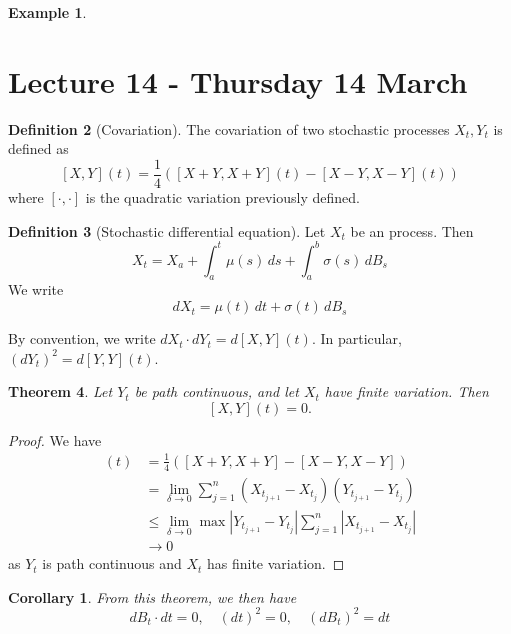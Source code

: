 \documentclass[10pt, oneside, reqno]{amsart}
\theoremstyle{plain}%
\newtheorem{thm}{Theorem}[section]
\newtheorem*{cor}{Corollary}
\theoremstyle{definition}
\newtheorem{defn}[thm]{Definition}
\newtheorem{exmp}[thm]{Example}
\theoremstyle{remark}
\begin{document}
\begin{exmp}
	
\end{exmp}

\section{Lecture 14 - Thursday 14 March} %
\label{sec:lecture_14_thursday_14_march}
\begin{defn}[Covariation]  The covariation of two stochastic processes $X_t, Y_t$ is defined as \[
	[X,Y](t) = \frac{1}{4}( [X+Y, X+Y](t) - [X-Y, X-Y](t))
\] where $[\cdot, \cdot]$ is the quadratic variation previously defined.
\end{defn}

\begin{defn}[Stochastic differential equation]
	Let $X_t$ be an \ito process.  Then \[
		X_t = X_a + \int_a^t \mu(s) \, ds + \int_a^b \sigma(s) \, dB_s
	\]  We write \[
		dX_t = \mu(t) \, dt + \sigma(t) \, dB_s
	\] 
	
	By convention, we write $dX_t \cdot dY_t = d[X,Y](t)$.  In particular, $(dY_t)^2 = d[Y,Y](t)$.  
\end{defn}

\begin{thm}
	Let $Y_t$ be path continuous, and let $X_t$ have finite variation.  Then \[
		[X,Y](t) = 0.
	\]
\end{thm}
\begin{proof}
	We have \begin{align*}
		[X,Y](t)	&= \frac{1}{4}( [X+Y, X+Y] - [X-Y, X-Y]) \\
					&= \lim_{\delta \rightarrow 0} \sum_{j=1}^n (X_{t_{j+1}} - X_{t_j})(Y_{t_{j+1}} - Y_{t_j}) \\
					&\leq \lim_{\delta \rightarrow 0} \max | Y_{t_{j+1}} - Y_{t_j} | \sum_{j=1}^n | X_{t_{j+1}} - X_{t_j} | \\
					&\rightarrow 0 		
	\end{align*} as $Y_t$ is path continuous and $X_t$ has finite variation.
\end{proof}

\begin{cor}
	From this theorem, we then have \[
		dB_t \cdot dt = 0, \quad (dt)^2 = 0, \quad (dB_t)^2 = dt 
	\]
\end{cor}
\end{document}

